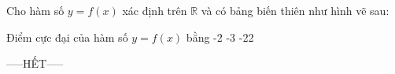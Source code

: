 \documentclass[12pt,a4paper]{article}
\begin{document}
\begin{ex}
 Cho hàm số $y=f(x)$ xác định trên $\mathbb{R}$ và có bảng biến thiên như hình vẽ sau:


 
\begin{center}
\end{center}
Điểm cực đại của hàm số $y=f(x)$ bằng
\choice
{ -2 }
   { -3 }
     {  }
    { -22 }
\end{ex}


 \begin{center}
-----HẾT-----
\end{center}

\end{document}

